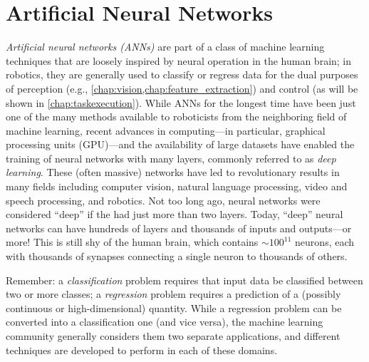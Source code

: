 \chapter{Artificial Neural Networks}\label{chap:ann}

\textsl{Artificial neural networks (ANNs)} are part of a class of machine learning techniques that are loosely inspired by neural operation in the human brain; in robotics, they are generally used to classify or regress data for the dual purposes of perception (e.g., \cref{chap:vision,chap:feature_extraction}) and control (as will be shown in \cref{chap:taskexecution}).
%
While ANNs for the longest time have been just one of the many methods available to roboticists from the neighboring field of machine learning, recent advances in computing---in particular, graphical processing units (GPU)---and the availability of large datasets have enabled the training of neural networks with many layers, commonly referred to as \textsl{deep learning}. These (often massive) networks have led to revolutionary results in many fields including computer vision, natural language processing, video and speech processing, and robotics.
%
Not too long ago, neural networks were considered ``deep'' if the had just more than two layers. Today, ``deep'' neural networks can have hundreds of layers and thousands of inputs and outputs---or more!
This is still shy of the human brain, which contains $\sim 100^{11}$ neurons, each with thousands of synapses connecting a single neuron to thousands of others.

\begin{mdframed}
Remember: a \textsl{classification} problem requires that input data be classified between two or more classes; a \textsl{regression} problem requires a prediction of a (possibly continuous or high-dimensional) quantity. While a regression problem can be converted into a classification one (and vice versa), the machine learning community generally considers them two separate applications, and different techniques are developed to perform in each of these domains.
\end{mdframed}

